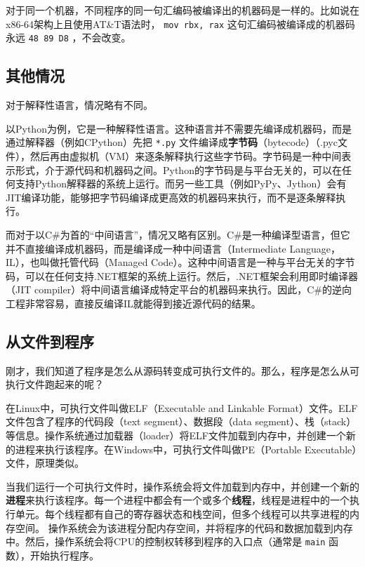 对于同一个机器，不同程序的同一句汇编码被编译出的机器码是一样的。比如说在x86-64架构上且使用AT\&T语法时， \texttt{mov rbx, rax} 这句汇编码被编译成的机器码永远 \texttt{48 89 D8} ，不会改变。

\subsection{其他情况}

对于解释性语言，情况略有不同。

以Python为例，它是一种解释性语言。这种语言并不需要先编译成机器码，而是通过解释器（例如CPython）先把 \texttt{*.py} 文件编译成\textbf{字节码}（bytecode）（.pyc文件），然后再由虚拟机（VM）来逐条解释执行这些字节码。字节码是一种中间表示形式，介于源代码和机器码之间。Python的字节码是与平台无关的，可以在任何支持Python解释器的系统上运行。而另一些工具（例如PyPy、Jython）会有JIT编译功能，能够把字节码编译成更高效的机器码来执行，而不是逐条解释执行。

而对于以C\#为首的“中间语言”，情况又略有区别。C\#是一种编译型语言，但它并不直接编译成机器码，而是编译成一种中间语言（Intermediate Language，IL），也叫做托管代码（Managed Code）。这种中间语言是一种与平台无关的字节码，可以在任何支持.NET框架的系统上运行。然后，.NET框架会利用即时编译器（JIT compiler）将中间语言编译成特定平台的机器码来执行。因此，C\#的逆向工程非常容易，直接反编译IL就能得到接近源代码的结果。

\subsection{从文件到程序}

刚才，我们知道了程序是怎么从源码转变成可执行文件的。那么，程序是怎么从可执行文件跑起来的呢？

在Linux中，可执行文件叫做ELF（Executable and Linkable Format）文件。ELF文件包含了程序的代码段（text segment）、数据段（data segment）、栈（stack）等信息。操作系统通过加载器（loader）将ELF文件加载到内存中，并创建一个新的进程来执行该程序。在Windows中，可执行文件叫做PE（Portable Executable）文件，原理类似。

当我们运行一个可执行文件时，操作系统会将文件加载到内存中，并创建一个新的\textbf{进程}来执行该程序。每一个进程中都会有一个或多个\textbf{线程}，线程是进程中的一个执行单元。每个线程都有自己的寄存器状态和栈空间，但多个线程可以共享进程的内存空间。
操作系统会为该进程分配内存空间，并将程序的代码和数据加载到内存中。然后，操作系统会将CPU的控制权转移到程序的入口点（通常是 \texttt{main} 函数），开始执行程序。

